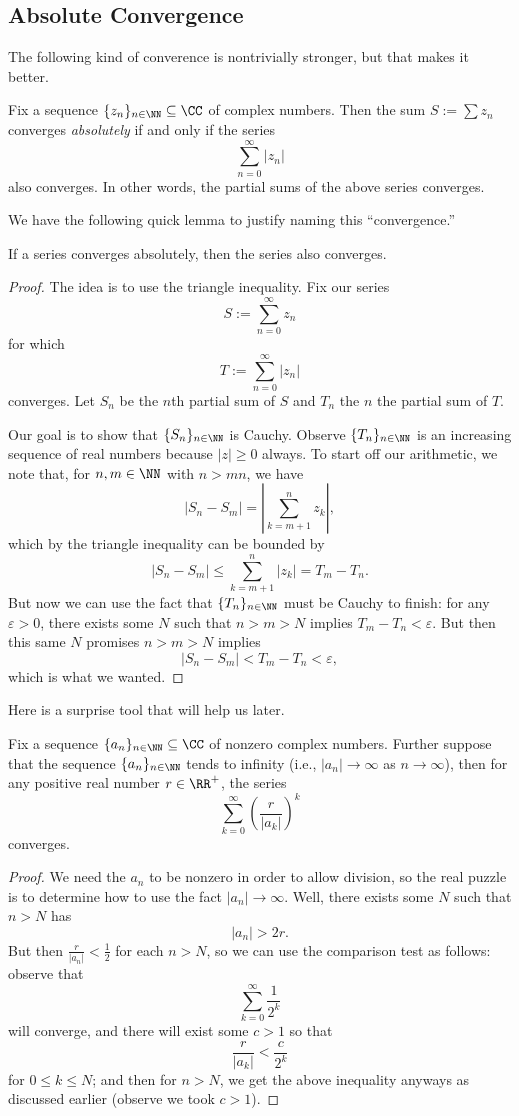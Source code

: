 \subsection{Absolute Convergence}
The following kind of converence is nontrivially stronger, but that makes it better.
\begin{definition}
	Fix a sequence $\{z_n\}_{n\in\NN}\subseteq\CC$ of complex numbers. Then the sum $S:=\sum z_n$ converges \textit{absolutely} if and only if the series
	\[\sum_{n=0}^\infty|z_n|\]
	also converges. In other words, the partial sums of the above series converges.
\end{definition}
We have the following quick lemma to justify naming this ``convergence.''
\begin{lemma}
	If a series converges absolutely, then the series also converges.
\end{lemma}
\begin{proof}
	The idea is to use the triangle inequality. Fix our series
	\[S:=\sum_{n=0}^\infty z_n\]
	for which
	\[T:=\sum_{n=0}^\infty|z_n|\]
	converges. Let $S_n$ be the $n$th partial sum of $S$ and $T_n$ the $n$ the partial sum of $T$.
	
	Our goal is to show that $\{S_n\}_{n\in\NN}$ is Cauchy. Observe $\{T_n\}_{n\in\NN}$ is an increasing sequence of real numbers because $|z|\ge0$ always. To start off our arithmetic, we note that, for $n,m\in\NN$ with $n>mn$, we have
	\[|S_n-S_m|=\left|\sum_{k=m+1}^nz_k\right|,\]
	which by the triangle inequality can be bounded by
	\[|S_n-S_m|\le\sum_{k=m+1}^n|z_k|=T_m-T_n.\]
	But now we can use the fact that $\{T_n\}_{n\in\NN}$ must be Cauchy to finish: for any $\varepsilon>0$, there exists some $N$ such that $n>m>N$ implies $T_m-T_n<\varepsilon$. But then this same $N$ promises $n>m>N$ implies
	\[|S_n-S_m|<T_m-T_n<\varepsilon,\]
	which is what we wanted.
\end{proof}
Here is a surprise tool that will help us later.
\begin{lemma}
	Fix a sequence $\{a_n\}_{n\in\NN}\subseteq\CC$ of nonzero complex numbers. Further suppose that the sequence $\{a_n\}_{n\in\NN}$ tends to infinity (i.e., $|a_n|\to\infty$ as $n\to\infty$), then for any positive real number $r\in\RR^+$, the series
	\[\sum_{k=0}^\infty\left(\frac r{|a_k|}\right)^k\]
	converges.
\end{lemma}
\begin{proof}
	We need the $a_n$ to be nonzero in order to allow division, so the real puzzle is to determine how to use the fact $|a_n|\to\infty$. Well, there exists some $N$ such that $n>N$ has
	\[|a_n|>2r.\]
	But then $\frac r{|a_n|}<\frac12$ for each $n>N$, so we can use the comparison test as follows: observe that
	\[\sum_{k=0}^\infty\frac1{2^k}\]
	will converge, and there will exist some $c>1$ so that
	\[\frac r{|a_k|}<\frac c{2^k}\]
	for $0\le k\le N$; and then for $n>N$, we get the above inequality anyways as discussed earlier (observe we took $c>1$).
\end{proof}
